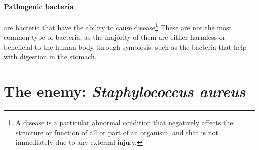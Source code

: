 \paragraph{Pathogenic bacteria} are bacteria that have the ability to cause disease\footnote{A disease is a particular abnormal condition that negatively affects the structure or function of all or part of an organism, and that is not immediately due to any external injury\cite{DorlandsMedicalDictionary2010}.} These are not the most common type of bacteria, as the majority of them are either harmless or beneficial to the human body through symbiosis, such as the bacteria that help with digestion in the stomach\cite{murrayMicrobiologiaMedica2013}.
\section{The enemy: \emph{Staphylococcus aureus}}
